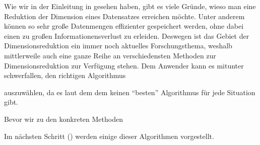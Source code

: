 Wie wir in der Einleitung in  gesehen haben, gibt es viele Gründe, wieso man
eine Reduktion der Dimension eines Datensatzes erreichen möchte. Unter anderem können so sehr große
Datenmengen effizienter gespeichert werden, ohne dabei einen zu großen Informationensverlust zu
erleiden. Deswegen ist das Gebiet der Dimensionsreduktion ein immer noch aktuelles Forschungsthema,
weshalb mittlerweile auch eine ganze Reihe an verschiedensten Methoden zur Dimensionsreduktion zur
Verfügung stehen. Dem Anwender kann es mitunter schwerfallen, den richtigen Algorithmus


auszuwählen, da es laut dem dem  \parencite{Wolpert.1997} keinen \enquote{besten} Algorithmus für jede Situation gibt.

Bevor wir zu den konkreten Methoden

Im nächsten Schritt () werden einige dieser Algorithmen vorgestellt.